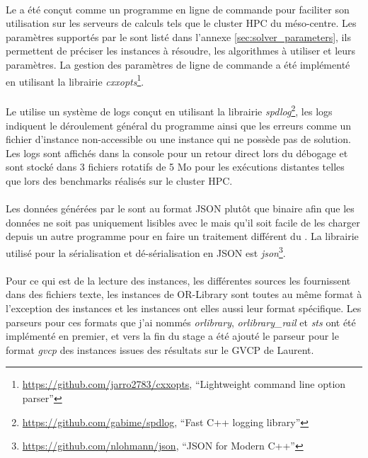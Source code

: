 \documentclass[a4paper,11pt,twoside,french,report]{../common/simplem}
\begin{document}
				\paragraph*{}
					Le \solver{} a été conçut comme un programme en ligne de commande pour faciliter son utilisation sur les serveurs de calculs tels que le cluster \gls{HPC} du méso-centre. Les paramètres supportés par le \solver{} sont listé dans l'annexe \ref{sec:solver_parameters}, ils permettent de préciser les instances à résoudre, les algorithmes à utiliser et leurs paramètres. La gestion des paramètres de ligne de commande a été implémenté en utilisant la librairie \textit{cxxopts}\footnote{\url{https://github.com/jarro2783/cxxopts}, ``Lightweight \Cpp{} command line option parser''}.
				\paragraph*{}
					Le \solver{} utilise un système de logs conçut en utilisant la librairie \textit{spdlog}\footnote{\url{https://github.com/gabime/spdlog}, ``Fast C++ logging library''}, les logs indiquent le déroulement général du programme ainsi que les erreurs comme un fichier d'instance non-accessible ou une instance qui ne possède pas de solution. Les logs sont affichés dans la console pour un retour direct lors du débogage et sont stocké dans 3 fichiers rotatifs de 5 Mo pour les exécutions distantes telles que lors des benchmarks réalisés sur le cluster \gls{HPC}.
				\paragraph*{}
					Les données générées par le \solver{} sont au format JSON plutôt que binaire afin que les données ne soit pas uniquement lisibles avec le \printer{} mais qu'il soit facile de les charger depuis un autre programme pour en faire un traitement différent du \printer{}. La librairie utilisé pour la sérialisation et dé-sérialisation en JSON est \textit{json}\footnote{\url{https://github.com/nlohmann/json}, ``JSON for Modern C++''}.
				\paragraph*{}
					Pour ce qui est de la lecture des instances, les différentes sources les fournissent dans des fichiers texte, les instances de OR-Library sont toutes au même format à l'exception des instances  et les instances  ont elles aussi leur format spécifique. Les parseurs pour ces formats que j'ai nommés \textit{orlibrary}, \textit{orlibrary\_rail} et \textit{sts} ont été implémenté en premier, et vers la fin du stage a été ajouté le parseur pour le format \textit{gvcp} des instances issues des résultats sur le \gls{GVCP} de Laurent.
	\printbibliography[heading=bibintoc]{}
	\printglossary[type=\acronymtype,nogroupskip=true,title=Lexique,toctitle=Lexique]{}
\end{document}
